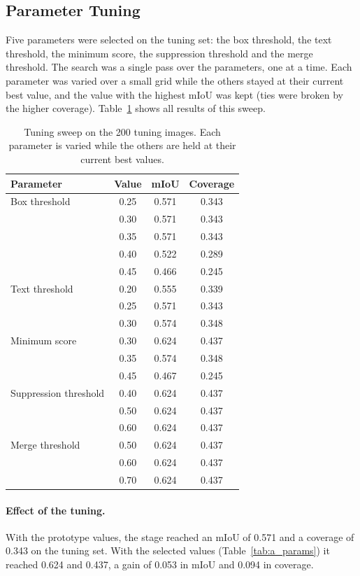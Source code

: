 \documentclass{FastFyp}
\begin{document}
\subsection{Parameter Tuning}
\label{subsec:e1-parameter-tuning}
Five parameters were selected on the tuning set: the box threshold, the text threshold, the minimum score, the suppression threshold and the merge threshold. The search was a single pass over the parameters, one at a time. Each parameter was varied over a small grid while the others stayed at their current best value, and the value with the highest mIoU was kept (ties were broken by the higher coverage). Table~\ref{tab:a_sweep} shows all results of this sweep.
 
\begin{table}[!ht]
\centering
\caption{Tuning sweep on the 200 tuning images. Each parameter is varied while the others are held at their current best values.}
\label{tab:a_sweep}
\begin{tabular}{|l|c|c|c|}
\hline
\textbf{Parameter} & \textbf{Value} & \textbf{mIoU} & \textbf{Coverage} \\ \hline
Box threshold & 0.25 & 0.571 & 0.343 \\
 & 0.30 & 0.571 & 0.343 \\
 & 0.35 & 0.571 & 0.343 \\
 & 0.40 & 0.522 & 0.289 \\
 & 0.45 & 0.466 & 0.245 \\ \hline
Text threshold & 0.20 & 0.555 & 0.339 \\
 & 0.25 & 0.571 & 0.343 \\
 & 0.30 & 0.574 & 0.348 \\ \hline
Minimum score & 0.30 & 0.624 & 0.437 \\
 & 0.35 & 0.574 & 0.348 \\
 & 0.45 & 0.467 & 0.245 \\ \hline
Suppression threshold & 0.40 & 0.624 & 0.437 \\
 & 0.50 & 0.624 & 0.437 \\
 & 0.60 & 0.624 & 0.437 \\ \hline
Merge threshold & 0.50 & 0.624 & 0.437 \\
 & 0.60 & 0.624 & 0.437 \\
 & 0.70 & 0.624 & 0.437 \\ \hline
\end{tabular}
\end{table}
 
\paragraph{Effect of the tuning.} With the prototype values, the stage reached an mIoU of 0.571 and a coverage of 0.343 on the tuning set. With the selected values (Table~\ref{tab:a_params}) it reached 0.624 and 0.437, a gain of 0.053 in mIoU and 0.094 in coverage.
 
\end{document}
